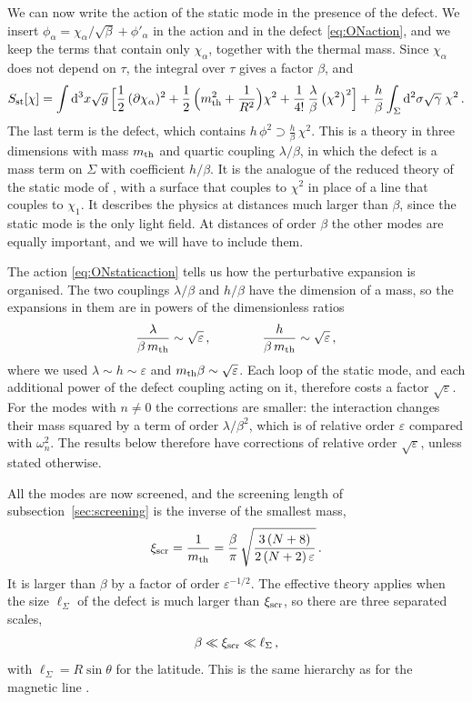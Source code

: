 \documentclass[a4paper,11pt]{article}
\newcommand{\xiscr}{\xi_{\rm scr}}
\newcommand{\dd}{\mathrm{d}}
\begin{document}
We can now write the action of the static mode in the presence of the defect. We insert $\phi_\alpha=\chi_\alpha/\sqrt\beta+\phi'_\alpha$ in the action and in the defect \eqref{eq:ONaction}, and we keep the terms that contain only $\chi_\alpha$, together with the thermal mass. Since $\chi_\alpha$ does not depend on $\tau$, the integral over $\tau$ gives a factor $\beta$, and
\begin{equation}\label{eq:ONstaticaction}
	S_{\rm st}[\chi]=\int\dd^3x\sqrt g\,\Bigl[\frac12\,(\partial\chi_\alpha)^2+\frac12\,\Bigl(m_{\rm th}^2+\frac{1}{R^2}\Bigr)\chi^2
	+\frac{1}{4!}\,\frac{\lambda}{\beta}\,\bigl(\chi^2\bigr)^2\Bigr]
	+\frac h\beta\int_\Sigma\dd^2\sigma\sqrt\gamma\;\chi^2\, .
\end{equation}
The last term is the defect, which contains $h\,\phi^2\supset\tfrac h\beta\,\chi^2$. This is a theory in three dimensions with mass $m_{\rm th}$ and quartic coupling $\lambda/\beta$, in which the defect is a mass term on $\Sigma$ with coefficient $h/\beta$. It is the analogue of the reduced theory of the static mode of \cite{BMP}, with a surface that couples to $\chi^2$ in place of a line that couples to $\chi_1$. It describes the physics at distances much larger than $\beta$, since the static mode is the only light field. At distances of order $\beta$ the other modes are equally important, and we will have to include them.

The action \eqref{eq:ONstaticaction} tells us how the perturbative expansion is organised. The two couplings $\lambda/\beta$ and $h/\beta$ have the dimension of a mass, so the expansions in them are in powers of the dimensionless ratios
\begin{equation}\label{eq:ONcounting}
	\frac{\lambda}{\beta\,m_{\rm th}}\sim\sqrt\varepsilon\, ,\qquad\qquad
	\frac{h}{\beta\,m_{\rm th}}\sim\sqrt\varepsilon\, ,
\end{equation}
where we used $\lambda\sim h\sim\varepsilon$ and $m_{\rm th}\beta\sim\sqrt\varepsilon$. Each loop of the static mode, and each additional power of the defect coupling acting on it, therefore costs a factor $\sqrt\varepsilon$. For the modes with $n\neq0$ the corrections are smaller: the interaction changes their mass squared by a term of order $\lambda/\beta^2$, which is of relative order $\varepsilon$ compared with $\omega_n^2$. The results below therefore have corrections of relative order $\sqrt\varepsilon$, unless stated otherwise.

All the modes are now screened, and the screening length of subsection~\ref{sec:screening} is the inverse of the smallest mass,
\begin{equation}\label{eq:ONxi}
	\xiscr=\frac{1}{m_{\rm th}}=\frac{\beta}{\pi}\,\sqrt{\frac{3\,(N+8)}{2\,(N+2)\,\varepsilon}}\, .
\end{equation}
It is larger than $\beta$ by a factor of order $\varepsilon^{-1/2}$. The effective theory applies when the size $\ell_\Sigma$ of the defect is much larger than $\xiscr$, so there are three separated scales,
\begin{equation}\label{eq:ONhier}
	\beta\ll\xiscr\ll\ell_\Sigma\, ,
\end{equation}
with $\ell_\Sigma=R\sin\theta$ for the latitude. This is the same hierarchy as for the magnetic line \cite{BMP}.
\end{document}
